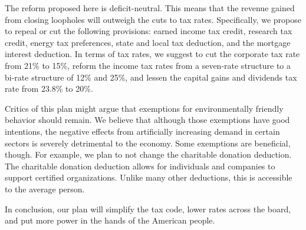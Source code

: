 \documentclass[12pt]{article}
\begin{document}
The reform proposed here is deficit-neutral. This means that the revenue gained
from closing loopholes will outweigh the cuts to tax rates. Specifically, we
propose to repeal or cut the following provisions: earned income tax credit,
research tax credit, energy tax preferences, state and local tax deduction, and
the mortgage interest deduction. In terms of tax rates, we suggest to cut the
corporate tax rate from 21\% to 15\%, reform the income tax rates from a
seven-rate structure to a bi-rate structure of 12\% and 25\%, and lessen the
capital gains and dividends tax rate from 23.8\% to 20\%.

Critics of this plan might argue that exemptions for environmentally friendly
behavior should remain. We believe that although those exemptions have good
intentions, the negative effects from artificially increasing demand in certain
sectors is severely detrimental to the economy. Some exemptions are beneficial,
though. For example, we plan to not change the charitable donation deduction.
The charitable donation deduction allows for individuals and companies to
support certified organizations. Unlike many other deductions, this is
accessible to the average person.

In conclusion, our plan will simplify the tax code, lower rates across the
board, and put more power in the hands of the American people.

\printbibliography[title={Bibliography}]
\end{document}
